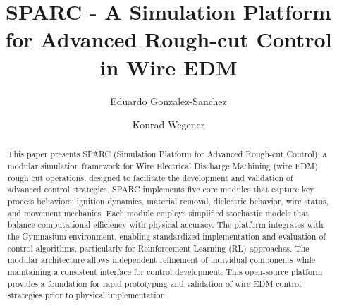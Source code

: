 \documentclass[5p,times,procedia]{elsarticle}
\begin{document}
\begin{frontmatter}



%

\title{SPARC - A Simulation Platform for Advanced Rough-cut Control \\in Wire EDM}


\author[a,b]{Eduardo Gonzalez-Sanchez\corref{*}}
\author[b]{Konrad Wegener}

\address[a]{ETH Zurich, Technoparkstrasse 1, 8092 Zurich, Switzerland}
\address[b]{Inspire AG, Technoparkstrasse 1, 8005 Zurich, Switzerland}


\begin{abstract}
This paper presents SPARC (Simulation Platform for Advanced Rough-cut Control), a modular simulation framework for Wire Electrical Discharge Machining (wire EDM) rough cut operations, designed to facilitate the development and validation of advanced control strategies. SPARC implements five core modules that capture key process behaviors: ignition dynamics, material removal, dielectric behavior, wire status, and movement mechanics. Each module employs simplified stochastic models that balance computational efficiency with physical accuracy. The platform integrates with the Gymnasium environment, enabling standardized implementation and evaluation of control algorithms, particularly for Reinforcement Learning (RL) approaches. The modular architecture allows independent refinement of individual components while maintaining a consistent interface for control development. This open-source platform provides a foundation for rapid prototyping and validation of wire EDM control strategies prior to physical implementation.
\end{abstract}


\end{frontmatter}
\end{document}
